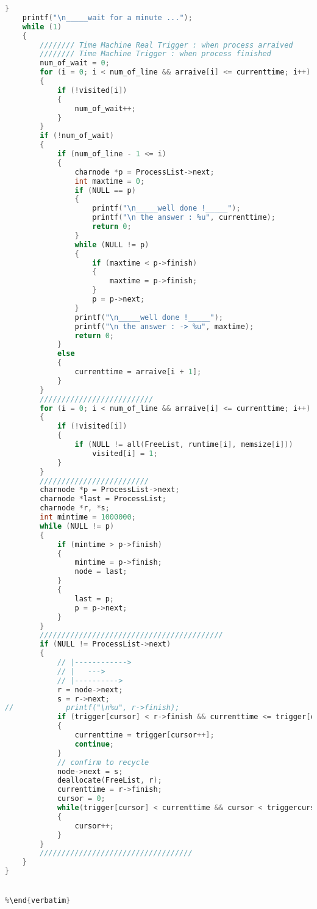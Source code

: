 \documentclass[UTF8]{ctexart}
\begin{document}
\begin{lstlisting}[language = C]
    }
    printf("\n_____wait for a minute ...");
    while (1)
    {
        //////// Time Machine Real Trigger : when process arraived
        //////// Time Machine Trigger : when process finished
        num_of_wait = 0;
        for (i = 0; i < num_of_line && arraive[i] <= currenttime; i++)
        {
            if (!visited[i])
            {
                num_of_wait++;
            }
        }
        if (!num_of_wait)
        {
            if (num_of_line - 1 <= i)
            {
                charnode *p = ProcessList->next;
                int maxtime = 0;
                if (NULL == p)
                {
                    printf("\n_____well done !_____");
                    printf("\n the answer : %u", currenttime);
                    return 0;
                }
                while (NULL != p)
                {
                    if (maxtime < p->finish)
                    {
                        maxtime = p->finish;
                    }
                    p = p->next;
                }
                printf("\n_____well done !_____");
                printf("\n the answer : -> %u", maxtime);
                return 0;
            }
            else
            {
                currenttime = arraive[i + 1];
            }
        }
        //////////////////////////
        for (i = 0; i < num_of_line && arraive[i] <= currenttime; i++)
        {
            if (!visited[i])
            {
                if (NULL != all(FreeList, runtime[i], memsize[i]))
                    visited[i] = 1;
            }
        }
        /////////////////////////
        charnode *p = ProcessList->next;
        charnode *last = ProcessList;
        charnode *r, *s;
        int mintime = 1000000;
        while (NULL != p)
        {
            if (mintime > p->finish)
            {
                mintime = p->finish;
                node = last;
            }
            {
                last = p;
                p = p->next;
            }
        }
        //////////////////////////////////////////
        if (NULL != ProcessList->next)
        {
            // |------------>
            // |   --->
            // |---------->
            r = node->next;
            s = r->next;
//            printf("\n%u", r->finish);
            if (trigger[cursor] < r->finish && currenttime <= trigger[cursor])
            {
                currenttime = trigger[cursor++];
                continue;
            }
            // confirm to recycle
            node->next = s;
            deallocate(FreeList, r);
            currenttime = r->finish;
            cursor = 0;
            while(trigger[cursor] < currenttime && cursor < triggercursor)
            {
                cursor++;
            }
        }
        ///////////////////////////////////
    }
}


%\end{verbatim}
\end{lstlisting}
\end{document}
